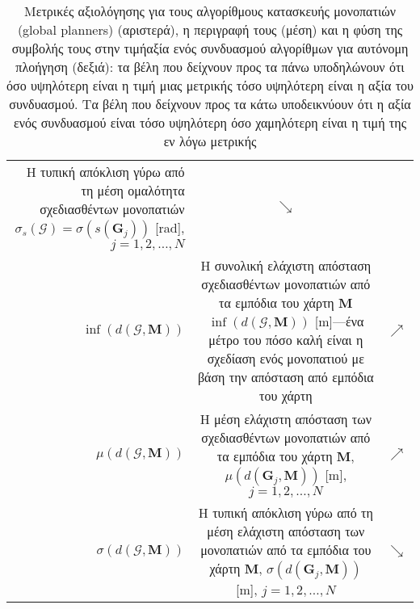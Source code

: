\begin{table}[h]
\begin{tabular}{rcc}
    \begin{minipage}[t]{0.7\columnwidth}%
      Η τυπική απόκλιση γύρω από τη μέση ομαλότητα σχεδιασθέντων μονοπατιών
      $\sigma_s(\bm{\mathcal{G}}) = \sigma(s(\bm{G}_j))$ [rad], $j = 1,2,\dots,N$
    \end{minipage} & $\searrow$ \\
    $\inf(d(\bm{\mathcal{G}},\bm{M}))$ &
    \begin{minipage}[t]{0.7\columnwidth}%
      Η συνολική ελάχιστη απόσταση σχεδιασθέντων μονοπατιών από τα εμπόδια του
      χάρτη $\bm{M}$
      $\inf(d(\bm{\mathcal{G}},\bm{M}))$ [m]---ένα μέτρο του πόσο καλή είναι
      η σχεδίαση ενός μονοπατιού με βάση την απόσταση από εμπόδια του χάρτη
    \end{minipage} & $\nearrow$ \\
    $\mu(d(\bm{\mathcal{G}}, \bm{M}))$ &
    \begin{minipage}[t]{0.7\columnwidth}%
      Η μέση ελάχιστη απόσταση των σχεδιασθέντων μονοπατιών από τα εμπόδια του
      χάρτη $\bm{M}$, $\mu(d(\bm{G}_j,\bm{M}))$ [m], $j = 1,2,\dots,N$
    \end{minipage} & $\nearrow$ \\
    $\sigma(d(\bm{\mathcal{G}},\bm{M}))$ &
    \begin{minipage}[t]{0.7\columnwidth}%
      Η τυπική απόκλιση γύρω από τη μέση ελάχιστη απόσταση των μονοπατιών
      από τα εμπόδια του χάρτη $\bm{M}$, $\sigma(d(\bm{G}_j,\bm{M}))$ [m],
      $j = 1,2,\dots,N$
    \end{minipage} & $\searrow$ \\ \bottomrule
  \end{tabular}
  \caption{\small Μετρικές αξιολόγησης για τους αλγορίθμους κατασκευής μονοπατιών
           (global planners) (αριστερά), η περιγραφή τους (μέση) και η φύση
           της συμβολής τους στην τιμήαξία ενός συνδυασμού αλγορίθμων για
           αυτόνομη πλοήγηση (δεξιά): τα βέλη που δείχνουν προς τα πάνω
           υποδηλώνουν ότι όσο υψηλότερη είναι η τιμή μιας μετρικής τόσο
           υψηλότερη είναι η αξία του συνδυασμού. Tα βέλη που δείχνουν προς τα
           κάτω υποδεικνύουν ότι η αξία ενός συνδυασμού είναι τόσο υψηλότερη
           όσο χαμηλότερη είναι η τιμή της εν λόγω μετρικής}
  \label{tbl:metrics_and_proportionality_global_planners}
\end{table}

